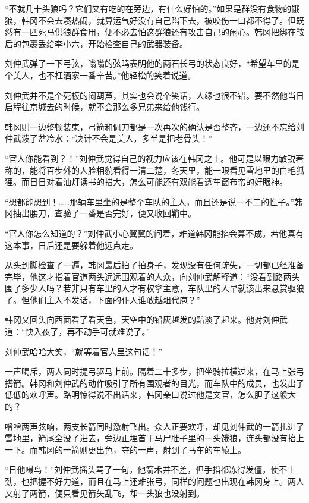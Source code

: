 “不就几十头狼吗？它们又有吃的在旁边，有什么好怕的。”如果是群没有食物的饿狼，韩冈不会去凑热闹，就算运气好没有自己陷下去，被咬伤一口都不得了。但既然有一匹死马供狼群食用，便不必去怕这群狼还有攻击自己的闲心。韩冈把绑在鞍后的包裹丢给李小六，开始检查自己的武器装备。

刘仲武弹了一下弓弦，嗡嗡的弦鸣表明他的两石长弓的状态良好，“希望车里的是个美人，也不枉洒家一番辛苦。”他轻松的笑着说道。

刘仲武并不是个死板的闷葫芦，其实也会说个笑话，人缘也很不错。要不然他当日启程往京城去的时候，就不会那么多兄弟来给他饯行。

韩冈则一边整顿装束，弓箭和佩刀都是一次再次的确认是否整齐，一边还不忘给刘仲武泼了盆冷水：“决计不会是美人，多半是把老骨头！”

“官人你能看到？！”刘仲武觉得自己的视力应该在韩冈之上。他可是以眼力敏锐著称的，能将百步外的人脸相貌看得一清二楚，冬天里，能一眼看见雪地里的白毛狐狸。而日日对着油灯读书的措大，怎么可能还有双能看透车窗布帘的好眼神。

“想都能想到！……那辆车里坐的是整个车队的主人，而且还是说一不二的性子。”韩冈抽出腰刀，查验了一番是否完好，便又收回鞘中。

“官人你怎么知道的？”刘仲武小心翼翼的问着，难道韩冈能掐会算不成。若他真有这本事，日后还是要躲着他远点走。

从头到脚检查了一遍，韩冈最后拍了拍身子，发现没有任何疏失，一切都已经准备完毕，他这才指着官道两头远远围观着的人众，向刘仲武解释道：“没看到路两头围了多少人吗？若非只有车里的人才有权拿主意，车队里的人早就该出来悬赏驱狼了。但他们主人不发话，下面的仆人谁敢越俎代庖？”

韩冈又回头向西面看了看天色，天空中的铅灰越发的黯淡了起来。他对刘仲武道：“快入夜了，再不动手可就难说了。”

刘仲武哈哈大笑，“就等着官人里这句话！”

一声喝斥，两人同时提弓驱马上前。隔着二十多步，把坐骑拉横过来，在马上张弓搭箭。韩冈和刘仲武的动作吸引了所有围观者的目光，而车队中的成员，也发出了低低的欢呼声。路明惊得说不出话来，韩冈亲口说过他是文官，怎么胆子这般大的？

噌噌两声弦响，两支长箭同时激射飞出。众人正要欢呼，却见刘仲武的一箭扎进了雪地里，箭尾全没了进去，旁边正埋首于马尸肚子里的一头饿狼，连头都没有抬上一下。而韩冈的一箭则更出色，夺的一声，射到了马车的车辕上。

“日他嘬鸟！”刘仲武摇头骂了一句，他箭术并不差，但手指都冻得发僵，使不上劲，也把握不好力道，而且在马上还难张弓，同样的问题也出现在韩冈身上。两人又射了两箭，便只看见箭矢乱飞，却一头狼也没射到。

